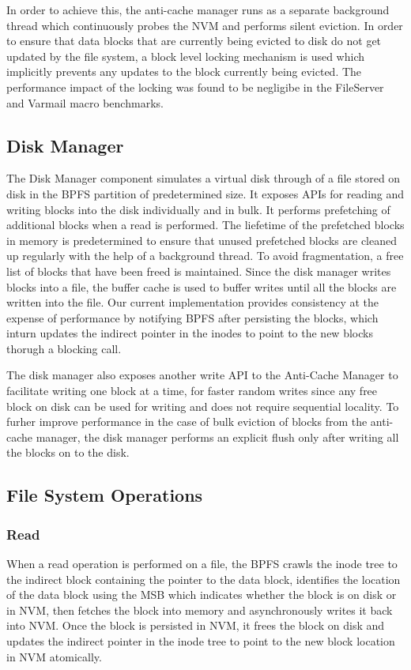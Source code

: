 In order to achieve this, the anti-cache manager runs as a separate background thread which continuously probes the NVM and performs silent eviction. In order to ensure that data blocks that are currently being evicted to disk do not get updated by the file system, a block level locking mechanism is used which implicitly prevents any updates to the block currently being evicted. The performance impact of the locking was found to be negligibe in the FileServer and Varmail macro benchmarks. 

\subsection{Disk Manager}
The Disk Manager component simulates a virtual disk through of a file stored on disk in the BPFS partition of predetermined size. It exposes APIs for reading and writing blocks into the disk individually and in bulk. It performs prefetching of additional blocks when a read is performed. The liefetime of the prefetched blocks in memory is predetermined to ensure that unused prefetched blocks are cleaned up regularly with the help of a background thread. To avoid fragmentation, a free list of blocks that have been freed is maintained. Since the disk manager writes blocks into a file, the buffer cache is used to buffer writes until all the blocks are written into the file. Our current implementation provides consistency at the expense of performance by notifying BPFS after persisting the blocks, which inturn updates the indirect pointer in the inodes to point to the new blocks thorugh a blocking call.

The disk manager also exposes another write API to the Anti-Cache Manager to facilitate writing one block at a time, for faster random writes since any free block on disk can be used for writing and does not require sequential locality. To furher improve performance in the case of bulk eviction of blocks from the anti-cache manager, the disk manager performs an explicit flush only after writing all the blocks on to the disk.

\subsection{File System Operations}

\subsubsection{Read}
When a read operation is performed on a file, the BPFS crawls the inode tree to the indirect block containing the pointer to the data block, identifies the location of the data block using the MSB which indicates whether the block is on disk or in NVM, then fetches the block into memory and asynchronously writes it back into NVM. Once the block is persisted in NVM, it frees the block on disk and updates the indirect pointer in the inode tree to point to the new block location in NVM atomically.

